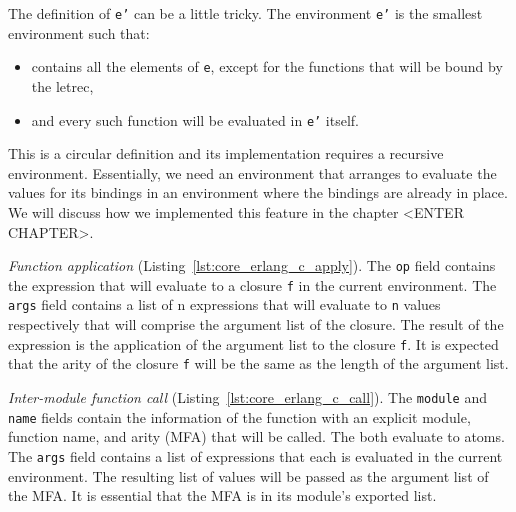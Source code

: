 The definition of \texttt{e’} can be a little tricky. The environment \texttt{e’} is the smallest
environment such that:

\begin{itemize}
  \item contains all the elements of \texttt{e}, except for the functions that will be
    bound by the letrec,
  \item and every such function will be evaluated in \texttt{e’} itself.
\end{itemize}

This is a circular definition and its implementation requires a recursive
environment. Essentially, we need an environment that arranges to evaluate the
values for its bindings in an environment where the bindings are already in
place. We will discuss how we implemented this feature in the chapter <ENTER
CHAPTER>.


\emph{Function application} (Listing~\ref{lst:core_erlang_c_apply}).
The \texttt{op} field contains the expression that will evaluate to a closure \texttt{f} in the
current environment. The \texttt{args} field contains a list of n expressions that will
evaluate to \texttt{n} values respectively that will comprise the argument list of the
closure. The result of the expression is the application of the argument list
to the closure \texttt{f}. It is expected that the arity of the closure \texttt{f} will be the
same as the length of the argument list.



\emph{Inter-module function call} (Listing~\ref{lst:core_erlang_c_call}).
The \texttt{module} and \texttt{name} fields contain the information of the function with an
explicit module, function name, and arity (MFA) that will be called. The both
evaluate to atoms. The \texttt{args} field contains a list of expressions that each is
evaluated in the current environment. The resulting list of values will be
passed as the argument list of the MFA. It is essential that the MFA is in its
module’s exported list.



